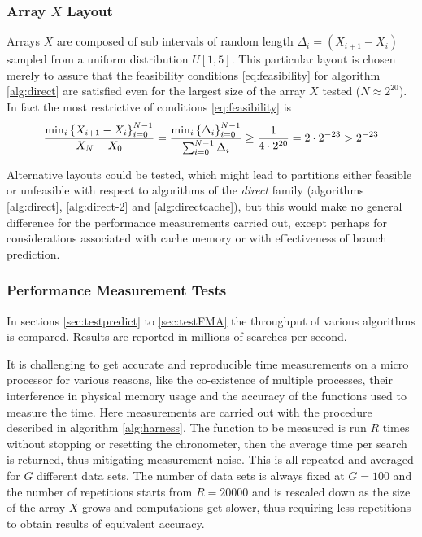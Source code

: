 \documentclass[preprint,1p,times]{elsarticle}
\begin{document}
\subsubsection{Array $X$ Layout}
\label{sec:arrayx} 
Arrays $X$ are composed of sub intervals of random length $\Delta_i=(X_{i+1}-X_i)$ sampled from a uniform distribution $U[1,5]$. This particular layout is chosen merely to assure that the feasibility conditions \eqref{eq:feasibility} for algorithm \ref{alg:direct} are satisfied even for the largest size of the array $X$ tested ($N \approx 2^{20}$). In fact the most restrictive of conditions \eqref{eq:feasibility} is
\begin{align*}
\frac{\min_i\left \{  X_{i+1}-X_{i}  \right \}_{i=0}^{N-1}}{X_N-X_0}
= \frac{\min_i\left \{  \Delta_i  \right \}_{i=0}^{N-1}}{\sum_{i=0}^{N-1}\Delta_i}
\geq \frac{1}{4\cdot 2^{20}}=2\cdot 2^{-23} > 2^{-23}
\end{align*}




Alternative layouts could be tested, which might lead to partitions either feasible or unfeasible with respect to algorithms of the \textit{direct} family (algorithms \ref{alg:direct}, \ref{alg:direct-2} and \ref{alg:directcache}), but this would make no general difference for the performance measurements carried out, except perhaps for considerations associated with cache memory or with effectiveness of branch prediction.

\subsubsection{Performance Measurement Tests}
In sections \ref{sec:testpredict} to \ref{sec:testFMA} the throughput of various algorithms is compared. Results are reported in millions of searches per second.

It is challenging to get accurate and reproducible time measurements on a micro processor for various reasons, like the co-existence of multiple processes, their interference in physical memory usage and the accuracy of the functions used to measure the time. Here measurements are carried out with the procedure described in algorithm \ref{alg:harness}. The function to be measured is run $R$ times without stopping or resetting the chronometer, then the average time per search is returned, thus mitigating measurement noise. This is all repeated and averaged for $G$ different data sets. The number of data sets is always fixed at $G=100$ and the number of repetitions starts from $R=20000$ and is rescaled down as the size of the array $X$ grows and computations get slower, thus requiring less repetitions to obtain results of equivalent accuracy.
\end{document}
